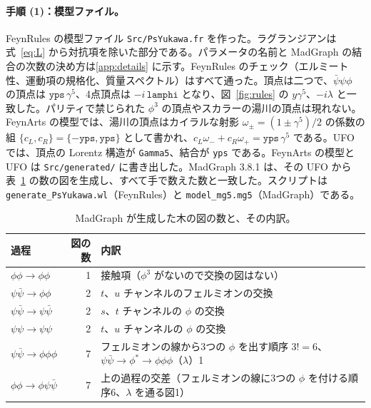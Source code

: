 \documentclass[a4paper,10pt]{ltjsarticle}
\begin{document}
\paragraph{手順 (1)：模型ファイル。}FeynRules の模型ファイル \texttt{Src/PsYukawa.fr} を作った。ラグランジアンは式~\eqref{eq:L} から対抗項を除いた部分である。パラメータの名前と MadGraph の結合の次数の決め方は\ref{app:details} に示す。FeynRules のチェック（エルミート性、運動項の規格化、質量スペクトル）はすべて通った。頂点は二つで、$\bar\psi\psi\phi$ の頂点は $\texttt{yps}\,\gamma^5$、4点頂点は $-i\,\texttt{lamphi}$ となり、図~\ref{fig:rules} の $y\gamma^5$、$-i\lambda$ と一致した。パリティで禁じられた $\phi^3$ の頂点やスカラーの湯川の頂点は現れない。FeynArts の模型では、湯川の頂点はカイラルな射影 $\omega_\pm=(1\pm\gamma^5)/2$ の係数の組 $\{c_L,c_R\}=\{-\texttt{yps},\texttt{yps}\}$ として書かれ、$c_L\omega_-+c_R\omega_+=\texttt{yps}\,\gamma^5$ である。UFO では、頂点の Lorentz 構造が \texttt{Gamma5}、結合が \texttt{yps} である。FeynArts の模型と UFO は \texttt{Src/generated/} に書き出した。MadGraph 3.8.1 は、その UFO から表~\ref{tab:diagrams} の数の図を生成し、すべて手で数えた数と一致した。スクリプトは \texttt{generate\_PsYukawa.wl}（FeynRules）と \texttt{model\_mg5.mg5}（MadGraph）である。

\begin{table}[tbp]
\centering\small
\caption{MadGraph が生成した木の図の数と、その内訳。}
\label{tab:diagrams}
\begin{tabular}{lrl}
\toprule
過程 & 図の数 & 内訳 \\
\midrule
$\phi\phi\to\phi\phi$ & 1 & 接触項（$\phi^3$ がないので交換の図はない） \\
$\psi\bar\psi\to\phi\phi$ & 2 & $t$、$u$ チャンネルのフェルミオンの交換 \\
$\psi\bar\psi\to\psi\bar\psi$ & 2 & $s$、$t$ チャンネルの $\phi$ の交換 \\
$\psi\psi\to\psi\psi$ & 2 & $t$、$u$ チャンネルの $\phi$ の交換 \\
$\psi\bar\psi\to\phi\phi\phi$ & 7 & フェルミオンの線から3つの $\phi$ を出す順序 $3!=6$、$\psi\bar\psi\to\phi^*\to\phi\phi\phi$（$\lambda$）1 \\
$\phi\phi\to\phi\psi\bar\psi$ & 7 & 上の過程の交差（フェルミオンの線に3つの $\phi$ を付ける順序6、$\lambda$ を通る図1） \\
\bottomrule
\end{tabular}
\end{table}
\end{document}
